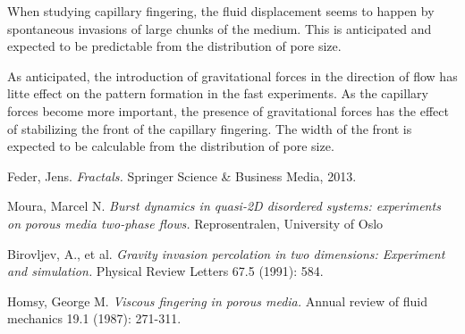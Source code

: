 \documentclass[twoside,utf8]{article}
\begin{document}
When studying capillary fingering, the fluid displacement seems to happen by spontaneous invasions of large chunks of the medium. This is anticipated and expected to be predictable from the distribution of pore size.

As anticipated, the introduction of gravitational forces in the direction of flow has litte effect on the pattern formation in the fast experiments. As the capillary forces become more important, the presence of gravitational forces has the effect of stabilizing the front of the capillary fingering. The width of the front is expected to be calculable from the distribution of pore size.









\begin{thebibliography}{99} %

 Feder, Jens.
 \newblock \textit{ Fractals. }
 \newbock Springer Science \& Business Media, 2013.

	Moura, Marcel N.
	\newblock \textit{ Burst dynamics in quasi-2D disordered systems: experiments on porous media two-phase flows. }
	\newblock Reprosentralen, University of Oslo

\bibitem{}
	Birovljev, A., et al.
	\newblock \textit{Gravity invasion percolation in two dimensions: Experiment and simulation.}
	\newblock Physical Review Letters 67.5 (1991): 584.

	Homsy, George M.
	\newblock \textit{ Viscous fingering in porous media.}
	\newblock Annual review of fluid mechanics 19.1 (1987): 271-311.

%


\end{thebibliography}
\end{document}
